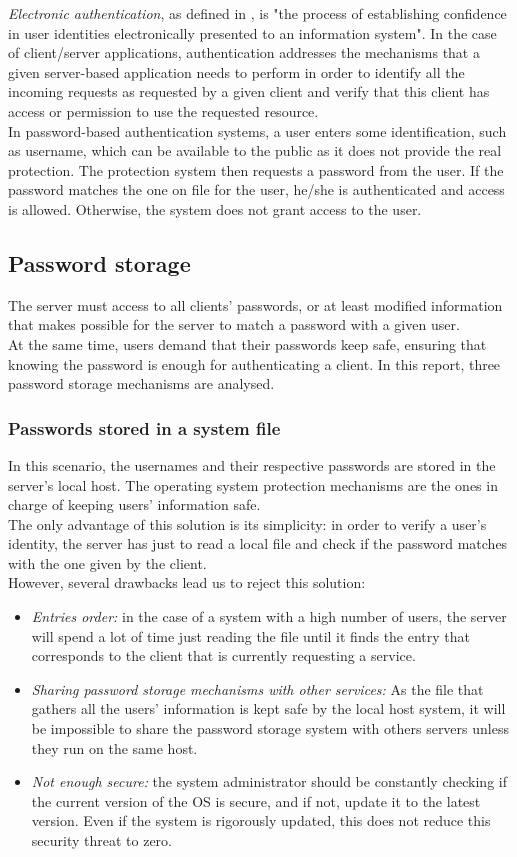 \textit{Electronic authentication}, as defined in \cite[p. 1]{Burr2013}, is "the process of establishing confidence in user identities electronically presented to an information system". In the case of client/server applications, authentication addresses the mechanisms that a given server-based application needs to perform in order to identify all the incoming requests as requested by a given client and verify that this client has access or permission to use the requested resource.\\
In password-based authentication systems, a user enters some identification, such as username, which can be available to the public as it does not provide the real protection. The protection system then requests a password from the user. If the password matches the one on file for the user, he/she is authenticated and access is allowed. Otherwise, the system does not grant access to the user.
\subsection{Password storage}\label{subsec:pwdstore}
The server must access to all clients' passwords, or at least modified information that makes possible for the server to match a password with a given user.\\
At the same time, users demand that their passwords keep safe, ensuring that knowing the password is enough for authenticating a client. In this report, three password storage mechanisms are analysed.
\subsubsection*{Passwords stored in a system file}\label{subsubsec:pwdstore1}
In this scenario, the usernames and their respective passwords are stored in the server's local host. The operating system protection mechanisms are the ones in charge of keeping users' information safe.\\
The only advantage of this solution is its simplicity: in order to verify a user's identity, the server has just to read a local file and check if the password matches with the one given by the client.\\
However, several drawbacks lead us to reject this solution:
\begin{itemize}
	\item \textit{Entries order:} in the case of a system with a high number of users, the server will spend a lot of time just reading the file until it finds the entry that corresponds to the client that is currently requesting a service.
	\item \textit{Sharing password storage mechanisms with other services:} As the file that gathers all the users' information is kept safe by the local host system, it will be impossible to share the password storage system with others servers unless they run on the same host.
	\item \textit{Not enough secure:} the system administrator should be constantly checking if the current version of the OS is secure, and if not, update it to the latest version. Even if the system is rigorously updated, this does not reduce this security threat to zero.
\end{itemize}
